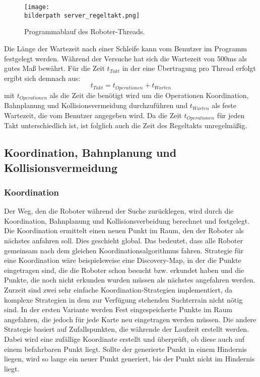\begin{figure}[h]
	\centering	
	\texttt{[image: \\bilderpath server\_regeltakt.png]}
	\caption{Programmablauf des Roboter-Threads.}
	\label{serv:fig:regeltakt}
\end{figure}

Die Länge der Wartezeit nach einer Schleife kann vom Benutzer im Programm festgelegt werden. Während der Versuche hat sich die Wartezeit von 500ms als gutes Maß bewährt. Für die Zeit $t_{Takt}$ in der eine Übertragung pro Thread erfolgt ergibt sich demnach aus: 
\begin{equation}
t_{Takt} = t_{Operationen}+t_{Warten}
\end{equation}
mit $t_{Operationen}$ als die Zeit die benötigt wird um die Operationen Koordination, Bahnplanung und Kollisionsvermeidung durchzuführen und $t_{Warten}$ als feste Wartezeit, die vom Benutzer angegeben wird. Da die Zeit $t_{Operationen}$ für jeden Takt unterschiedlich ist, ist folglich auch die Zeit des Regeltakts unregelmäßig. 

\subsection{Koordination, Bahnplanung und Kollisionsvermeidung}\label{serv:kbk}
\subsubsection{Koordination}
Der Weg, den die Roboter während der Suche zurücklegen, wird durch die Koordination, Bahnplanung und Kollisionsverbeidung berechnet und festgelegt. Die Koordination ermittelt einen neuen Punkt im Raum, den der Roboter als nächstes anfahren soll. Dies geschieht global. Das bedeutet, dass alle Roboter gemeinsam nach dem gleichen Koordinationsalgorithmus fahren. Strategie für eine Koordination wäre beispielsweise eine Discovery-Map, in der die Punkte eingetragen sind, die die Roboter schon besucht bzw. erkundet haben und die Punkte, die noch nicht erkunden wurden müssen als nächstes angefahren werden. Zurzeit sind zwei sehr einfache Koordination-Strategien implementiert, da komplexe Strategien in dem zur Verfügung stehenden Suchterrain nicht nötig sind. In der ersten Variante werden Fest eingespeicherte Punkte im Raum angefahren, die jedoch für jede Karte neu eingetragen werden müssen. Die andere Strategie basiert auf Zufallspunkten, die währende der Laufzeit erstellt werden. Dabei wird eine zufällige Koordinate erstellt und überprüft, ob diese auch auf einem befahrbaren Punkt liegt. Sollte der generierte Punkt in einem Hindernis liegen, wird so lange ein neuer Punkt generiert, bis der Punkt nicht im Hindernis liegt.\\
